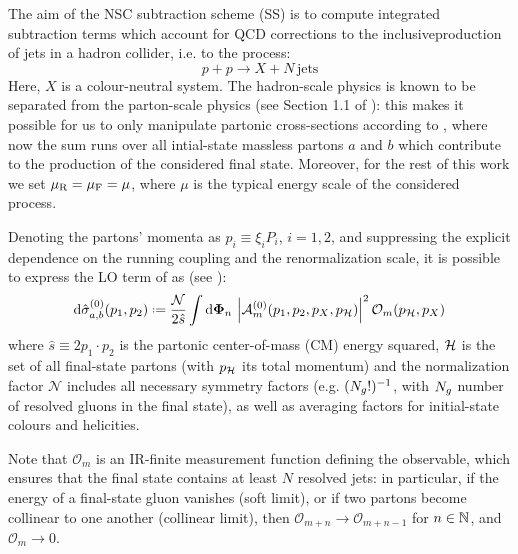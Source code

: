 
The aim of the NSC subtraction scheme (SS) is to compute integrated subtraction terms which account for QCD corrections to the inclusive\footnotemark production of jets in a hadron collider, i.e. to the process:
\begin{equation}
  p + p \rightarrow X + N \,\text{jets}
\end{equation}
Here, $ X $ is a colour-neutral system. The hadron-scale physics is known to be separated from the parton-scale physics (see Section 1.1 of \cite{Collins-2011}): this makes it possible for us to only manipulate partonic cross-sections according to , where now the sum runs over all intial-state massless partons $ a $ and $ b $ which contribute to the production of the considered final state. Moreover, for the rest of this work we set $ \mu_\text{R} = \mu_\text{F} = \mu $, where $ \mu $ is the typical energy scale of the considered process.


Denoting the partons' momenta as $ p_i \equiv \xi_i P_i $, $ i = 1,2 $, and suppressing the explicit dependence on the running coupling and the renormalization scale, it is possible to express the LO term of  as (see ):
\begin{equation}
  \dd\pcs_{a,b}^{(0)}(p_1 , p_2) \defeq \frac{\mathcal{N}}{2\hat{s}} \int \lps_n \, \abs{\ampl^{(0)}_m(p_1, p_2, p_X, p_\fs)}^2 \mathcal{O}_m(p_\fs, p_X)
\end{equation}
where $ \hat{s} \equiv 2 p_1 \cdot p_2 $ is the partonic center-of-mass (CM) energy squared, $ \mathcal{H} $ is the set of all final-state partons (with $ p_{\mathcal{H}} $ its total momentum) and the normalization factor $ \mathcal{N} $ includes all necessary symmetry factors (e.g. $ (N_g!)^{-1} $, with $ N_g $ number of resolved gluons in the final state), as well as averaging factors for initial-state colours and helicities.

Note that $ \mathcal{O}_m $ is an IR-finite measurement function defining the observable, which ensures that the final state contains at least $ N $ resolved jets: in particular, if the energy of a final-state gluon vanishes (soft limit), or if two partons become collinear to one another (collinear limit), then $ \mathcal{O}_{m + n} \rightarrow \mathcal{O}_{m + n - 1} $ for $ n \in \mathbb{N} $, and $ \mathcal{O}_m \rightarrow 0 $.

